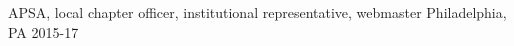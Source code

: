 
\begin{cvhonors}

\cvhonor
{APSA, local chapter}
{officer, institutional representative, webmaster}
{Philadelphia, PA}
{2015-17}

\end{cvhonors}
